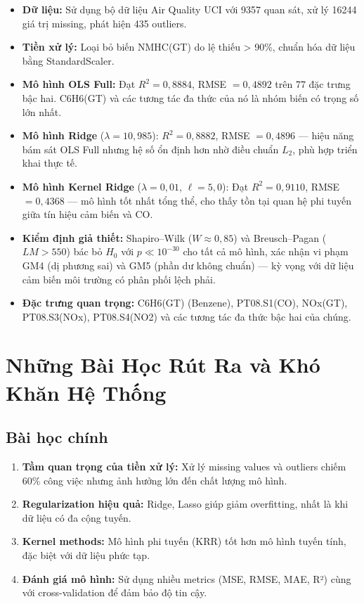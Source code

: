 \documentclass[12pt,a4paper]{report}
\begin{document}
\begin{itemize}
    \item \textbf{Dữ liệu:} Sử dụng bộ dữ liệu Air Quality UCI với 9357 quan sát, xử lý 16244 giá trị missing, phát hiện 435 outliers.
    \item \textbf{Tiền xử lý:} Loại bỏ biến NMHC(GT) do lệ thiếu > 90\%, chuẩn hóa dữ liệu bằng StandardScaler.
    \item \textbf{Mô hình OLS Full:} Đạt $R^2 = 0{,}8884$, RMSE $= 0{,}4892$ trên 77 đặc trưng bậc hai. C6H6(GT) và các tương tác đa thức của nó là nhóm biến có trọng số lớn nhất.
    \item \textbf{Mô hình Ridge} ($\lambda = 10{,}985$): $R^2 = 0{,}8882$, RMSE $= 0{,}4896$ --- hiệu năng bám sát OLS Full nhưng hệ số ổn định hơn nhờ điều chuẩn $L_2$, phù hợp triển khai thực tế.
    \item \textbf{Mô hình Kernel Ridge} ($\lambda = 0{,}01$, $\ell = 5{,}0$): Đạt $R^2 = 0{,}9110$, RMSE $= 0{,}4368$ --- mô hình tốt nhất tổng thể, cho thấy tồn tại quan hệ phi tuyến giữa tín hiệu cảm biến và CO.
    \item \textbf{Kiểm định giả thiết:} Shapiro--Wilk ($W \approx 0{,}85$) và Breusch--Pagan ($LM > 550$) bác bỏ $H_0$ với $p \ll 10^{-30}$ cho tất cả mô hình, xác nhận vi phạm GM4 (dị phương sai) và GM5 (phần dư không chuẩn) --- kỳ vọng với dữ liệu cảm biến môi trường có phân phối lệch phải.
    \item \textbf{Đặc trưng quan trọng:} C6H6(GT) (Benzene), PT08.S1(CO), NOx(GT), PT08.S3(NOx), PT08.S4(NO2) và các tương tác đa thức bậc hai của chúng.
\end{itemize}
 
\section{Những Bài Học Rút Ra và Khó Khăn Hệ Thống}
 
\subsection{Bài học chính}
 
\begin{enumerate}
    \item \textbf{Tầm quan trọng của tiền xử lý:} Xử lý missing values và outliers chiếm 60\% công việc nhưng ảnh hưởng lớn đến chất lượng mô hình.
    \item \textbf{Regularization hiệu quả:} Ridge, Lasso giúp giảm overfitting, nhất là khi dữ liệu có đa cộng tuyến.
    \item \textbf{Kernel methods:} Mô hình phi tuyến (KRR) tốt hơn mô hình tuyến tính, đặc biệt với dữ liệu phức tạp.
    \item \textbf{Đánh giá mô hình:} Sử dụng nhiều metrics (MSE, RMSE, MAE, R²) cùng với cross-validation để đảm bảo độ tin cậy.
\end{enumerate}
 
\end{document}
